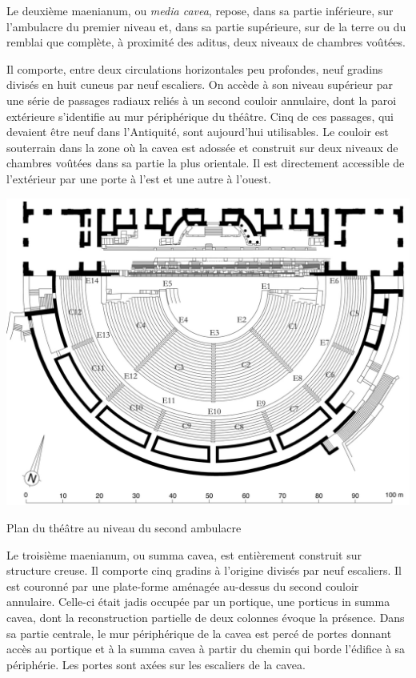Le deuxième \gls{maenianum}, ou \textit{media cavea}, repose, dans sa partie inférieure, sur l'\gls{ambulacre} du premier niveau et, dans sa partie supérieure, sur de la terre ou du remblai que complète, à proximité des aditus, deux niveaux de chambres voûtées. 
		
		
		Il comporte, entre deux circulations horizontales peu profondes, neuf gradins
divisés en huit cuneus par neuf escaliers. On accède à son niveau supérieur par une série de
passages radiaux reliés à un second couloir annulaire, dont la paroi extérieure s'identifie au
mur périphérique du théâtre. Cinq de ces passages, qui devaient être neuf dans l'Antiquité,
sont aujourd'hui utilisables. Le couloir est souterrain dans la zone où la cavea est adossée et
construit sur deux niveaux de chambres voûtées dans sa partie la plus orientale. Il est
directement accessible de l'extérieur par une porte à l'est et une autre à l'ouest.
		
	\begin{figureth}
		\includegraphics[width=\linewidth]{images/2emeniveau}
		\caption[Vue de dessus - 2ème niveau]{Plan du théâtre au niveau du second ambulacre \cite[Pl. XVIII]{orangePl}}
		\label{2emeniveau}
	\end{figureth}		
		
		
Le troisième maenianum, ou summa cavea, est entièrement construit sur structure creuse. Il comporte cinq gradins à l'origine divisés par neuf escaliers. Il est couronné par une
plate-forme aménagée au-dessus du second couloir annulaire. Celle-ci était jadis occupée
par un portique, une porticus in summa cavea, dont la reconstruction partielle de deux
colonnes évoque la présence. Dans sa partie centrale, le mur périphérique de la cavea est
percé de portes donnant accès au portique et à la summa cavea à partir du chemin qui borde
l'édifice à sa périphérie. Les portes sont axées sur les escaliers de la cavea.

